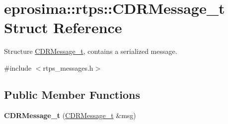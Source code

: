 \hypertarget{structeprosima_1_1rtps_1_1_c_d_r_message__t}{\section{eprosima\-:\-:rtps\-:\-:\-C\-D\-R\-Message\-\_\-t \-Struct \-Reference}
\label{structeprosima_1_1rtps_1_1_c_d_r_message__t}
}


\-Structure \hyperlink{structeprosima_1_1rtps_1_1_c_d_r_message__t}{\-C\-D\-R\-Message\-\_\-t}, contains a serialized message.  




{\ttfamily \#include $<$rtps\-\_\-messages.\-h$>$}

\subsection*{\-Public \-Member \-Functions}
\begin{DoxyCompactItemize}
\item 
\hypertarget{structeprosima_1_1rtps_1_1_c_d_r_message__t_a150b12ad316658f611ba699b43954f4b}{{\bfseries \-C\-D\-R\-Message\-\_\-t} (\hyperlink{structeprosima_1_1rtps_1_1_c_d_r_message__t}{\-C\-D\-R\-Message\-\_\-t} \&msg)}\label{structeprosima_1_1rtps_1_1_c_d_r_message__t_a150b12ad316658f611ba699b43954f4b}

\end{DoxyCompactItemize}
